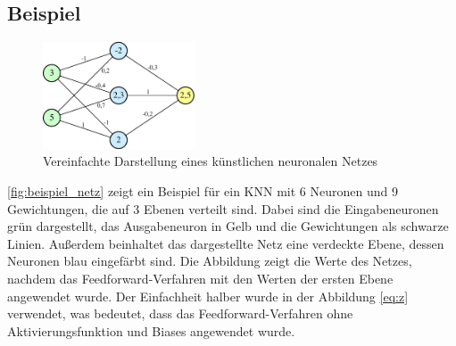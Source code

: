 \subsection{Beispiel}\label{subsec:beispiel}
\begin{figure}
    \includegraphics[width=0.4\textwidth]{grafiken/netzwerk_beispiel}
    \caption[Vereinfachte Darstellung eines künstlichen neuronalen Netzes: \textit{Eigene Grafik, erstellt in Inkscape}]{Vereinfachte Darstellung eines künstlichen neuronalen Netzes}
    \label{fig:beispiel_netz}
\end{figure}
\autoref{fig:beispiel_netz} zeigt ein Beispiel für ein KNN mit 6 Neuronen und 9 Gewichtungen, die auf 3 Ebenen verteilt sind.
Dabei sind die Eingabeneuronen grün dargestellt, das Ausgabeneuron in Gelb und die Gewichtungen als schwarze Linien.
Außerdem beinhaltet das dargestellte Netz eine verdeckte Ebene, dessen Neuronen blau eingefärbt sind.
Die Abbildung zeigt die Werte des Netzes, nachdem das Feedforward-Verfahren mit den Werten der ersten Ebene angewendet wurde.
Der Einfachheit halber wurde in der Abbildung \autoref{eq:z} verwendet, was bedeutet, dass das Feedforward-Verfahren ohne Aktivierungsfunktion und Biases angewendet wurde.